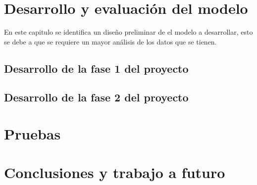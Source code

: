 \documentclass[12pt,letterpaper]{report}
\begin{document}
\chapter{Desarrollo y evaluación del modelo}
En este capitulo se identifica un diseño preliminar de el modelo a desarrollar, esto se debe a que se requiere un mayor análisis de los datos que se tienen.
\section{Desarrollo de la fase 1 del proyecto}







\section{Desarrollo de la fase 2 del proyecto}
\label{sec:desarrollo-fase2}






\chapter{Pruebas}


\chapter{Conclusiones y trabajo a futuro}

\end{document}
